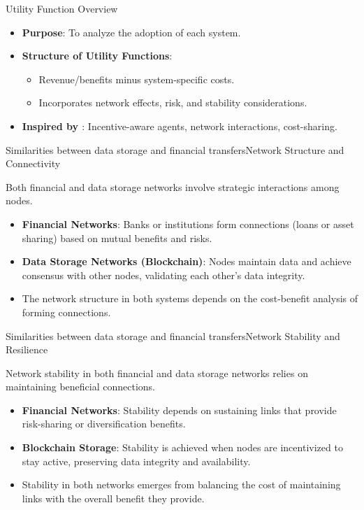 \documentclass[aspectratio=169]{beamer}
\begin{document}
    \begin{frame}{Utility Function Overview}
    \begin{itemize}
        \item \textbf{Purpose}: To analyze the adoption of each system.
        \item \textbf{Structure of Utility Functions}:
        \begin{itemize}
            \item Revenue/benefits minus system-specific costs.
            \item Incorporates network effects, risk, and stability considerations.
        \end{itemize}
        \item \textbf{Inspired by \cite{jalan_incentive-aware_2024} }: Incentive-aware agents, network interactions, cost-sharing.
    \end{itemize}
    \end{frame}

    \begin{frame}{Similarities between data storage and financial transfers}{Network Structure and Connectivity}
    
    Both financial and data storage networks involve strategic interactions among nodes. \vspace{3mm}
    
    \begin{itemize}
        \item \textbf{Financial Networks}: Banks or institutions form connections (loans or asset sharing) based on mutual benefits and risks.
        \item \textbf{Data Storage Networks (Blockchain)}: Nodes maintain data and achieve consensus with other nodes, validating each other’s data integrity.
        \item The network structure in both systems depends on the cost-benefit analysis of forming connections.
    \end{itemize}
    \end{frame}
    
    \begin{frame}{Similarities between data storage and financial transfers}{Network Stability and Resilience}
        
    Network stability in both financial and data storage networks relies on maintaining beneficial connections.
    \vspace{3mm}
    
    \begin{itemize}
        \item \textbf{Financial Networks}: Stability depends on sustaining links that provide risk-sharing or diversification benefits.
        \item \textbf{Blockchain Storage}: Stability is achieved when nodes are incentivized to stay active, preserving data integrity and availability.
        \item Stability in both networks emerges from balancing the cost of maintaining links with the overall benefit they provide.
    \end{itemize}
    \end{frame}
    
\end{document}
